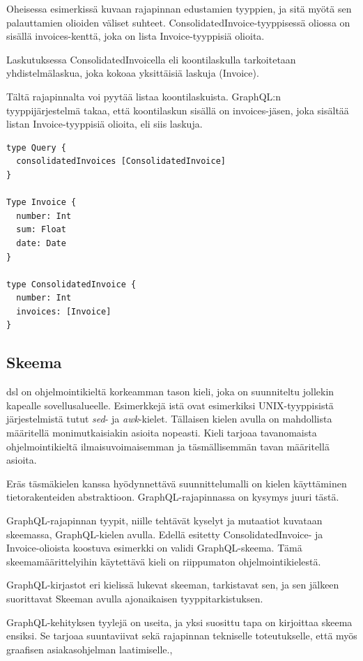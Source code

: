 Oheisessa esimerkissä kuvaan rajapinnan edustamien tyyppien, ja sitä
myötä sen palauttamien olioiden väliset suhteet.
ConsolidatedInvoice-tyyppisessä oliossa on sisällä invoices-kenttä, joka
on lista Invoice-tyyppisiä olioita.

Laskutuksessa ConsolidatedInvoicella eli koontilaskulla tarkoitetaan
yhdistelmälaskua, joka kokoaa yksittäisiä laskuja (Invoice).

Tältä rajapinnalta voi pyytää listaa koontilaskuista. GraphQL:n
tyyppijärjestelmä takaa, että koontilaskun sisällä on invoices-jäsen,
joka sisältää listan Invoice-tyyppisiä olioita, eli siis laskuja.

\begin{verbatim}
type Query {
  consolidatedInvoices [ConsolidatedInvoice]
}

Type Invoice {
  number: Int
  sum: Float
  date: Date
}

type ConsolidatedInvoice {
  number: Int
  invoices: [Invoice]
}
\end{verbatim}

\hypertarget{skeema}{%
\subsection{Skeema}\label{skeema}}

\Gls{dsl} on ohjelmointikieltä korkeamman tason kieli, joka on
suunniteltu jollekin kapealle sovellusalueelle.\cite{landin1966next}
Esimerkkejä istä ovat esimerkiksi UNIX-tyyppisistä
järjestelmistä tutut \emph{sed}- ja \emph{awk}-kielet. Tällaisen kielen
avulla on mahdollista määritellä monimutkaisiakin asioita
nopeasti.\cite{Raymond2003} Kieli tarjoaa tavanomaista ohjelmointikieltä
ilmaisuvoimaisemman ja täsmällisemmän tavan määritellä asioita.

Eräs täsmäkielen kanssa hyödynnettävä suunnittelumalli on kielen
käyttäminen tietorakenteiden abstraktioon.\cite{Spi00b}
GraphQL-rajapinnassa on kysymys juuri tästä.

GraphQL-rajapinnan tyypit, niille tehtävät kyselyt ja mutaatiot kuvataan
skeemassa, GraphQL-kielen avulla. Edellä esitetty ConsolidatedInvoice-
ja Invoice-olioista koostuva esimerkki on validi GraphQL-skeema. Tämä
skeemamäärittelyihin käytettävä kieli on riippumaton
ohjelmointikielestä.

GraphQL-kirjastot eri kielissä lukevat skeeman, tarkistavat sen, ja sen
jälkeen suorittavat Skeeman avulla ajonaikaisen tyyppitarkistuksen.

GraphQL-kehityksen tyylejä on useita, ja yksi suosittu tapa on
kirjoittaa skeema ensiksi. Se tarjoaa suuntaviivat sekä rajapinnan
tekniselle toteutukselle, että myös graafisen asiakasohjelman
laatimiselle.\cite{SchemaDriven2017Nov},\cite{SchemaDrivenDesign2021Jul}

